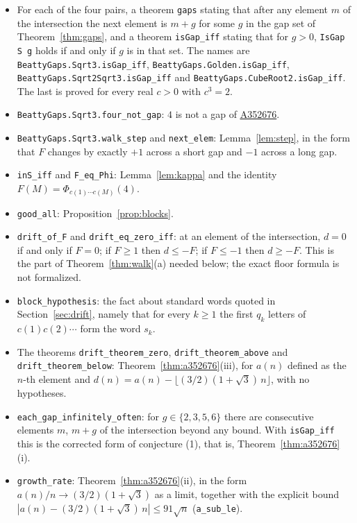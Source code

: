 \documentclass[12pt]{article}
\newcommand{\seqnum}[1]{\href{https://oeis.org/#1}{\underline{#1}}}
\newcommand{\fl}[1]{\lfloor #1 \rfloor}
\theoremstyle{plain}
\theoremstyle{remark}
\begin{document}
\begin{itemize}
\item For each of the four pairs, a theorem \texttt{gaps} stating that after any element $m$ of
the intersection the next element is $m+g$ for some $g$ in the gap set of
Theorem~\ref{thm:gaps}, and a theorem \texttt{isGap\_iff} stating that for $g>0$,
\texttt{IsGap S g} holds if and only if $g$ is in that set. The names are
\texttt{BeattyGaps.Sqrt3.isGap\_iff}, \texttt{BeattyGaps.Golden.isGap\_iff},
\texttt{BeattyGaps.Sqrt2Sqrt3.isGap\_iff} and \texttt{BeattyGaps.CubeRoot2.isGap\_iff}. The
last is proved for every real $c>0$ with $c^3=2$.
\item \texttt{BeattyGaps.Sqrt3.four\_not\_gap}: $4$ is not a gap of \seqnum{A352676}.
\item \texttt{BeattyGaps.Sqrt3.walk\_step} and \texttt{next\_elem}: Lemma~\ref{lem:step}, in
the form that $F$ changes by exactly $+1$ across a short gap and $-1$ across a long gap.
\item \texttt{inS\_iff} and \texttt{F\_eq\_Phi}: Lemma~\ref{lem:kappa} and the identity
$F(M)=\Phi_{c(1)\cdots c(M)}(4)$.
\item \texttt{good\_all}: Proposition~\ref{prop:blocks}.
\item \texttt{drift\_of\_F} and \texttt{drift\_eq\_zero\_iff}: at an element of the intersection,
$d=0$ if and only if $F=0$; if $F\ge1$ then $d\le-F$; if $F\le-1$ then $d\ge-F$. This is the part
of Theorem~\ref{thm:walk}(a) needed below; the exact floor formula is not formalized.
\item \texttt{block\_hypothesis}: the fact about standard words quoted in
Section~\ref{sec:drift}, namely that for every $k\ge1$ the first $q_k$ letters of
$c(1)c(2)\cdots$ form the word $s_k$.
\item The theorems \texttt{drift\_theorem\_zero}, \texttt{drift\_theorem\_above}
and\\ \texttt{drift\_theorem\_below}: Theorem~\ref{thm:a352676}(iii), for $a(n)$ defined as the $n$-th
element and $d(n)=a(n)-\fl{(3/2)(1+\sqrt3)\,n}$, with no hypotheses.
\item \texttt{each\_gap\_infinitely\_often}: for $g\in\{2,3,5,6\}$ there are consecutive elements
$m$, $m+g$ of the intersection beyond any bound. With \texttt{isGap\_iff} this is the corrected
form of conjecture (1), that is, Theorem~\ref{thm:a352676}(i).
\item \texttt{growth\_rate}: Theorem~\ref{thm:a352676}(ii), in the form
$a(n)/n\to(3/2)(1+\sqrt3)$ as a limit, together with the explicit bound
$|a(n)-(3/2)(1+\sqrt3)\,n|\le 91\sqrt n$ (\texttt{a\_sub\_le}).
\end{itemize}
\end{document}
